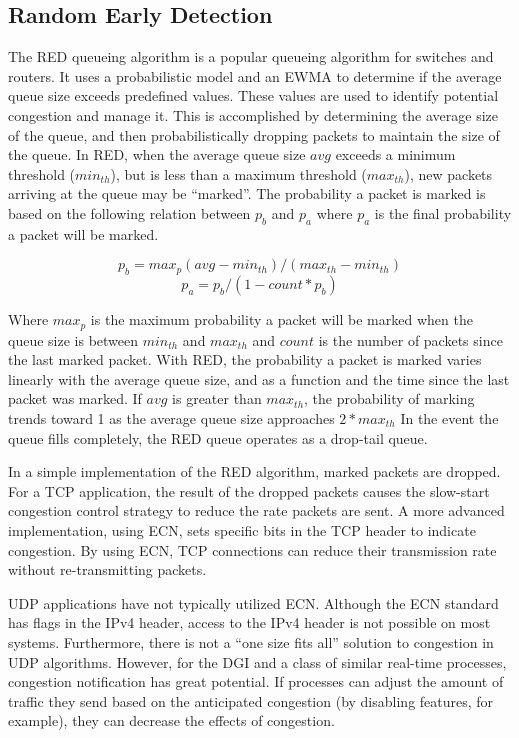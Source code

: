 \subsection{Random Early Detection}
The \ac{RED} queueing algorithm is a popular queueing algorithm for switches and routers.
It uses a probabilistic model and an \ac{EWMA} to determine if the average queue size exceeds predefined values.
These values are used to identify potential congestion and manage it.
This is accomplished by determining the average size of the queue, and then probabilistically dropping packets to maintain the size of the queue.
In \ac{RED}, when the average queue size $avg$ exceeds a minimum threshold ($min_{th}$), but is less than a maximum threshold ($max_{th}$), new packets arriving at the queue may be ``marked''.
The probability a packet is marked is based on the following relation between $p_{b}$ and $p_{a}$ where $p_{a}$ is the final probability a packet will be marked.

\begin{equation}
p_{b} = max_p (avg - min_{th}) / (max_{th}-min_{th})
\end{equation}
\begin{equation}
p_{a} = p_{b} / (1-count * p_b)
\end{equation}

Where $max_p$ is the maximum probability a packet will be marked when the queue size is between $min_{th}$ and $max_{th}$ and $count$ is the number of packets since the last marked packet.
With \ac{RED}, the probability a packet is marked varies linearly with the average queue size, and as a function and the time since the last packet was marked.
If $avg$ is greater than $max_{th}$, the probability of marking trends toward 1 as the average queue size approaches $2*max_{th}$
In the event the queue fills completely, the \ac{RED} queue operates as a drop-tail queue.

In a simple implementation of the \ac{RED} algorithm, marked packets are dropped.
For a TCP application, the result of the dropped packets causes the slow-start congestion control strategy to reduce the rate packets are sent.
A more advanced implementation, using \ac{ECN}, sets specific bits in the TCP header to indicate congestion.
By using \ac{ECN}, TCP connections can reduce their transmission rate without re-transmitting packets.

UDP applications have not typically utilized \ac{ECN}.
Although the \ac{ECN} standard has flags in the IPv4 header, access to the IPv4 header is not possible on most systems.
Furthermore, there is not a ``one size fits all'' solution to congestion in UDP algorithms.
However, for the \ac{DGI} and a class of similar real-time processes, congestion notification has great potential.
If processes can adjust the amount of traffic they send based on the anticipated congestion (by disabling features, for example), they can decrease the effects of congestion.


